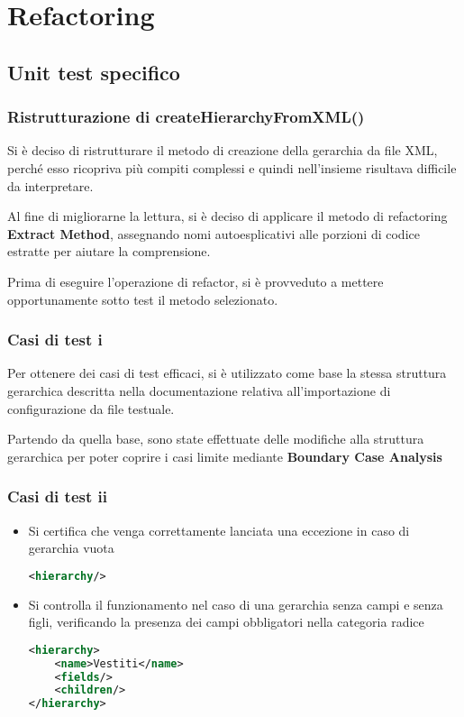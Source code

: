 
\section{Refactoring}

\subsection{Unit test specifico}
\begin{frame}
    \frametitle{Ristrutturazione di createHierarchyFromXML()}
    Si è deciso di ristrutturare il metodo di creazione della gerarchia da file XML, perché esso ricopriva più compiti complessi e quindi nell'insieme risultava difficile da interpretare.\pause

    Al fine di migliorarne la lettura, si è deciso di applicare il metodo di refactoring \textbf{Extract Method}, assegnando nomi autoesplicativi alle porzioni di codice estratte per aiutare la comprensione.\pause

    Prima di eseguire l'operazione di refactor, si è provveduto a mettere opportunamente sotto test il metodo selezionato.
\end{frame}

\begin{frame}
    \frametitle{Casi di test i}
    Per ottenere dei casi di test efficaci, si è utilizzato come base la stessa struttura gerarchica descritta nella documentazione relativa all'importazione di configurazione da file testuale.\pause

    Partendo da quella base, sono state effettuate delle modifiche alla struttura gerarchica per poter coprire i casi limite mediante \textbf{Boundary Case Analysis}
\end{frame}

\begin{frame}[fragile]
    \frametitle{Casi di test ii}
    \lstset{style=java}
    \begin{itemize}
        \item <1-> Si certifica che venga correttamente lanciata una eccezione in caso di gerarchia vuota
\begin{lstlisting}[language=xml]
<hierarchy/>
\end{lstlisting}
        \item <2-> Si controlla il funzionamento nel caso di una gerarchia senza campi e senza figli, verificando la presenza dei campi obbligatori nella categoria radice
\begin{lstlisting}[language=xml]
<hierarchy>
    <name>Vestiti</name>
    <fields/>
    <children/>
</hierarchy>
\end{lstlisting}
    \end{itemize}
\end{frame}
\note{
    
}

